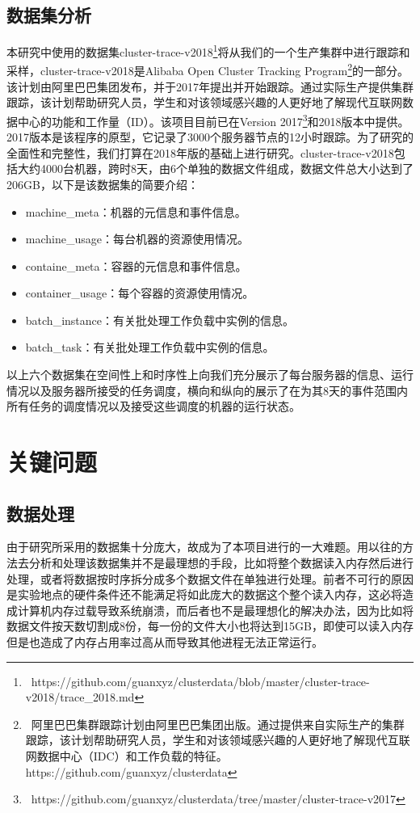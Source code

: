 \subsection{数据集分析}
本研究中使用的数据集cluster-trace-v2018\footnote{\ https://github.com/guanxyz/clusterdata/blob/master/cluster-trace-v2018/trace\_2018.md}将从我们的一个生产集群中进行跟踪和采样，cluster-trace-v2018是Alibaba Open Cluster Tracking Program\footnote{\ 阿里巴巴集群跟踪计划由阿里巴巴集团出版。通过提供来自实际生产的集群跟踪，该计划帮助研究人员，学生和对该领域感兴趣的人更好地了解现代互联网数据中心（IDC）和工作负载的特征。https://github.com/guanxyz/clusterdata}的一部分。该计划由阿里巴巴集团发布，并于2017年提出并开始跟踪。通过实际生产提供集群跟踪，该计划帮助研究人员，学生和对该领域感兴趣的人更好地了解现代互联网数据中心的功能和工作量（ID）。该项目目前已在Version 2017\footnote{\ https://github.com/guanxyz/clusterdata/tree/master/cluster-trace-v2017}和2018版本中提供。 2017版本是该程序的原型，它记录了3000个服务器节点的12小时跟踪。为了研究的全面性和完整性，我们打算在2018年版的基础上进行研究。cluster-trace-v2018包括大约4000台机器，跨时8天，由6个单独的数据文件组成，数据文件总大小达到了206GB，以下是该数据集的简要介绍：
\begin{itemize}
	\item machine\_meta：机器的元信息和事件信息。
	\item machine\_usage：每台机器的资源使用情况。
	\item containe\_meta：容器的元信息和事件信息。
	\item container\_usage：每个容器的资源使用情况。
	\item batch\_instance：有关批处理工作负载中实例的信息。
	\item batch\_task：有关批处理工作负载中实例的信息。
\end{itemize}

以上六个数据集在空间性上和时序性上向我们充分展示了每台服务器的信息、运行情况以及服务器所接受的任务调度，横向和纵向的展示了在为其8天的事件范围内所有任务的调度情况以及接受这些调度的机器的运行状态。
\section{关键问题}
\subsection{数据处理}
由于研究所采用的数据集十分庞大，故成为了本项目进行的一大难题。用以往的方法去分析和处理该数据集并不是最理想的手段，比如将整个数据读入内存然后进行处理，或者将数据按时序拆分成多个数据文件在单独进行处理。前者不可行的原因是实验地点的硬件条件还不能满足将如此庞大的数据这个整个读入内存，这必将造成计算机内存过载导致系统崩溃，而后者也不是最理想化的解决办法，因为比如将数据文件按天数切割成8份，每一份的文件大小也将达到15GB，即使可以读入内存但是也造成了内存占用率过高从而导致其他进程无法正常运行。

